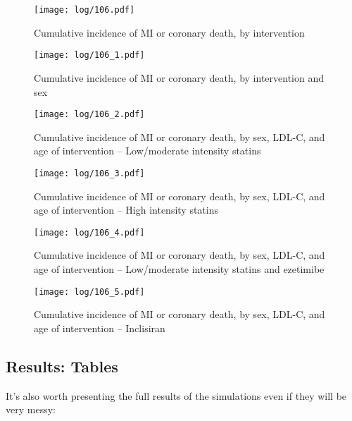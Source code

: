 \documentclass[11pt]{article}
\begin{document}
\color{Blue4}
\begin{stlog}\end{stlog}
\begin{figure}
    \centering
    \texttt{[image: log/106.pdf]}
    \caption{Cumulative incidence of MI or coronary death, by intervention}
    \label{PSArfig1}
\end{figure}
\begin{figure}
    \centering
    \texttt{[image: log/106\_1.pdf]}
    \caption{Cumulative incidence of MI or coronary death, by intervention and sex}
    \label{PSArfig2}
\end{figure}
\begin{figure}
    \centering
    \texttt{[image: log/106\_2.pdf]}
    \caption{Cumulative incidence of MI or coronary death, by sex, LDL-C, and age of intervention -- Low/moderate intensity statins}
    \label{PSArfig3}
\end{figure}
\begin{figure}
    \centering
    \texttt{[image: log/106\_3.pdf]}
    \caption{Cumulative incidence of MI or coronary death, by sex, LDL-C, and age of intervention -- High intensity statins}
    \label{PSArfig4}
\end{figure}
\begin{figure}
    \centering
    \texttt{[image: log/106\_4.pdf]}
    \caption{Cumulative incidence of MI or coronary death, by sex, LDL-C, and age of intervention -- Low/moderate intensity statins and ezetimibe}
    \label{PSArfig5}
\end{figure}
\begin{figure}
    \centering
    \texttt{[image: log/106\_5.pdf]}
    \caption{Cumulative incidence of MI or coronary death, by sex, LDL-C, and age of intervention -- Inclisiran}
    \label{PSArfig6}
\end{figure}
\begin{stlog}\end{stlog}
\color{black}

\subsection{Results: Tables}

It's also worth presenting the full results of the simulations
even if they will be very messy:

\color{Blue4}
\begin{stlog}\end{stlog}
\color{black}
\end{document}
